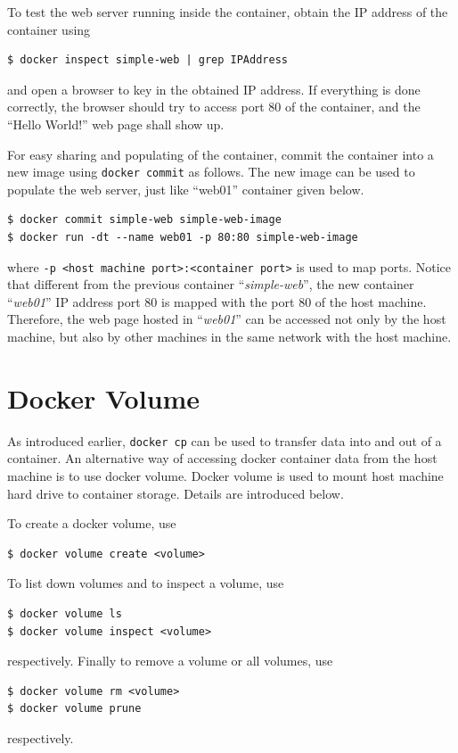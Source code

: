 To test the web server running inside the container, obtain the IP address of the container using
\begin{lstlisting}
$ docker inspect simple-web | grep IPAddress
\end{lstlisting}
and open a browser to key in the obtained IP address. If everything is done correctly, the browser should try to access port 80 of the container, and the ``Hello World!'' web page shall show up.

For easy sharing and populating of the container, commit the container into a new image using \verb|docker commit| as follows. The new image can be used to populate the web server, just like ``web01'' container given below.
\begin{lstlisting}
$ docker commit simple-web simple-web-image
$ docker run -dt --name web01 -p 80:80 simple-web-image
\end{lstlisting}
where \verb|-p <host machine port>:<container port>| is used to map ports. Notice that different from the previous container ``\textit{simple-web}'', the new container ``\textit{web01}'' IP address port 80 is mapped with the port 80 of the host machine. Therefore, the web page hosted in ``\textit{web01}'' can be accessed not only by the host machine, but also by other machines in the same network with the host machine.

\section{Docker Volume} \label{ch:vac:subsec:dockervolume}

As introduced earlier, \verb|docker cp| can be used to transfer data into and out of a container. An alternative way of accessing docker container data from the host machine is to use docker volume. Docker volume is used to mount host machine hard drive to container storage. Details are introduced below.

To create a docker volume, use
\begin{lstlisting}
$ docker volume create <volume>
\end{lstlisting}
To list down volumes and to inspect a volume, use
\begin{lstlisting}
$ docker volume ls
$ docker volume inspect <volume>
\end{lstlisting}
respectively. Finally to remove a volume or all volumes, use
\begin{lstlisting}
$ docker volume rm <volume>
$ docker volume prune
\end{lstlisting}
respectively.

